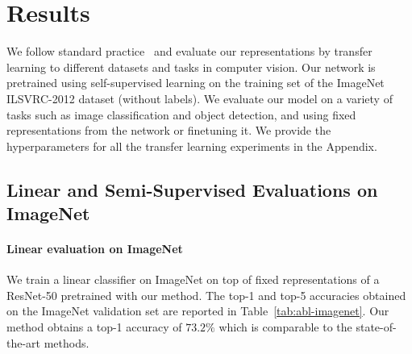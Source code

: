 \section{Results}

We follow standard practice~\cite{goyal2019scaling} and evaluate our representations by transfer learning to different datasets and tasks in computer vision.
Our network is pretrained using self-supervised learning on the training set of the ImageNet ILSVRC-2012 dataset \cite{deng2009imagenet} (without labels). We evaluate our model on a variety of tasks such as image classification and object detection, and using fixed representations from the network or finetuning it. We provide the hyperparameters for all the transfer learning experiments in the Appendix.


\subsection{Linear and Semi-Supervised Evaluations on ImageNet}

\paragraph{Linear evaluation on ImageNet}

We train a linear classifier on ImageNet on top of fixed representations of a ResNet-50 pretrained with our method. The top-1 and top-5 accuracies obtained on the ImageNet validation set are reported in Table~\ref{tab:abl-imagenet}. Our method obtains a top-1 accuracy of $73.2\%$ which is comparable to the state-of-the-art methods.


